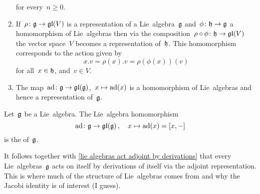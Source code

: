 \begin{examples}
\begin{enumerate}
      for every~$n \geq 0$.
    \item
      If~$\rho \colon \mathfrak{g} \to \mathfrak{gl}(V)$ is a representation of a Lie~algebra~$\mathfrak{g}$ and~$\phi \colon \mathfrak{h} \to \mathfrak{g}$ a homomorphism of Lie~algebras then via the composition~$\rho \circ \phi \colon \mathfrak{h} \to \mathfrak{gl}(V)$ the vector space~$V$ becomes a representation of~$\mathfrak{h}$.
      This homomorphism corresponds to the action given by
      \[
        x.v = \rho(x).v = \rho(\phi(x))(v)
      \]
      for all~$x \in \mathfrak{h}$, and~$v \in V$.
    \item
      The map~$\operatorname{ad} \colon \mathfrak{g} \to \mathfrak{gl}(\mathfrak{g})$,~$x \mapsto \operatorname{ad}(x)$ is a homomorphism of Lie~algebras and hence a representation of~$\mathfrak{g}$.
  \end{enumerate}
\end{examples}


\begin{definition}
  Let~$\mathfrak{g}$ be a Lie~algebra.
  The  Lie~algebra homomorphism
  \[
    \operatorname{ad}
    \colon
    \mathfrak{g}
    \to
    \mathfrak{gl}(\mathfrak{g}) \,,
    \quad
    x
    \mapsto
    \operatorname{ad}(x)
    =
    [x,-]
  \]
  is the  of~$\mathfrak{g}$.
\end{definition}


\begin{remark}
  It follows together with \cref{lie algebras act adjoint by derivations} that every Lie~algebras~$\mathfrak{g}$ acts on itself by derivations of itself via the adjoint representation.
  This is where much of the structure of Lie~algebras comes from and why the Jacobi identity is of interest (I guess).
\end{remark}



